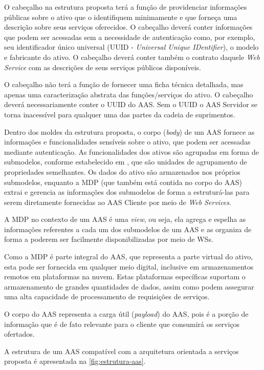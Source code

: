 O cabeçalho na estrutura proposta terá a função de providenciar informações públicas sobre o ativo que o identifiquem minimamente e que forneça uma descrição sobre seus serviços oferecidos. O cabeçalho deverá conter informações que podem ser acessadas sem a necessidade de autenticação como, por exemplo, seu identificador único universal (UUID - \textit{Universal Unique IDentifier}), o modelo e fabricante do ativo. O cabeçalho deverá conter também o contrato daquele \textit{Web Service} com as descrições de seus serviços públicos disponíveis.

O cabeçalho não terá a função de fornecer uma ficha técnica detalhada, mas apenas uma caracterização abstrata das funções/serviços do ativo. O cabeçalho deverá necessariamente conter o UUID do AAS. Sem o UUID o AAS Servidor se torna inacessível para qualquer uma das partes da cadeia de suprimentos.

Dentro dos moldes da estrutura proposta, o corpo (\textit{body}) de um AAS fornece as informações e funcionalidades sensíveis sobre o ativo, que podem ser acessadas mediante autenticação. As funcionalidades dos ativos são agrupadas em forma de submodelos, conforme estabelecido em , que são unidades de agrupamento de propriedades semelhantes. Os dados do ativo são armazenados nos próprios submodelos, enquanto a MDP (que também está contida no corpo do AAS) extrai e gerencia as informações dos submodelos de forma a estruturá-las para serem diretamente fornecidas ao AAS Cliente por meio de \textit{Web Services}.

A MDP no contexto de um AAS é uma \textit{view}, ou seja, ela agrega e espelha as informações referentes a cada um dos submodelos de um AAS e as organiza de forma a poderem ser facilmente disponibilizadas por meio de WSs.

Como a MDP é parte integral do AAS, que representa a parte virtual do ativo, esta pode ser fornecida em qualquer meio digital, inclusive em armazenamentos remotos em plataformas na nuvem. Estas plataformas específicas suportam o armazenamento de grandes quantidades de dados, assim como podem assegurar uma alta capacidade de processamento de requisições de serviços.

O corpo do AAS representa a carga útil (\textit{payload}) do AAS, pois é a porção de informação que é de fato relevante para o cliente que consumirá os serviços ofertados.

A estrutura de um AAS compatível com a arquitetura orientada a serviços proposta é apresentada na \autoref{fig:estrutura-aas}.

